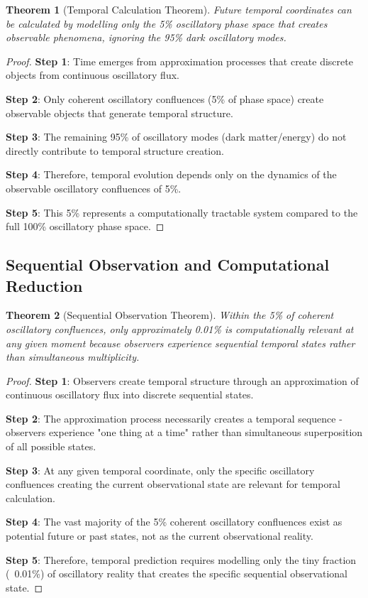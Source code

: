 \documentclass[11pt]{article}
\newtheorem{theorem}{Theorem}[section]
\theoremstyle{remark}
\begin{document}
\begin{theorem}[Temporal Calculation Theorem]
Future temporal coordinates can be calculated by modelling only the 5\% oscillatory phase space that creates observable phenomena, ignoring the 95\% dark oscillatory modes.
\end{theorem}

\begin{proof}
\textbf{Step 1}: Time emerges from approximation processes that create discrete objects from continuous oscillatory flux.

\textbf{Step 2}: Only coherent oscillatory confluences (5\% of phase space) create observable objects that generate temporal structure.

\textbf{Step 3}: The remaining 95\% of oscillatory modes (dark matter/energy) do not directly contribute to temporal structure creation.

\textbf{Step 4}: Therefore, temporal evolution depends only on the dynamics of the observable oscillatory confluences of 5\%.

\textbf{Step 5}: This 5\% represents a computationally tractable system compared to the full 100\% oscillatory phase space.
\end{proof}

\subsection{Sequential Observation and Computational Reduction}

\begin{theorem}[Sequential Observation Theorem]
Within the 5\% of coherent oscillatory confluences, only approximately 0.01\% is computationally relevant at any given moment because observers experience sequential temporal states rather than simultaneous multiplicity.
\end{theorem}

\begin{proof}
\textbf{Step 1}: Observers create temporal structure through an approximation of continuous oscillatory flux into discrete sequential states.

\textbf{Step 2}: The approximation process necessarily creates a temporal sequence - observers experience "one thing at a time" rather than simultaneous superposition of all possible states.

\textbf{Step 3}: At any given temporal coordinate, only the specific oscillatory confluences creating the current observational state are relevant for temporal calculation.

\textbf{Step 4}: The vast majority of the 5\% coherent oscillatory confluences exist as potential future or past states, not as the current observational reality.

\textbf{Step 5}: Therefore, temporal prediction requires modelling only the tiny fraction (~0.01\%) of oscillatory reality that creates the specific sequential observational state.
\end{proof}
\end{document}
